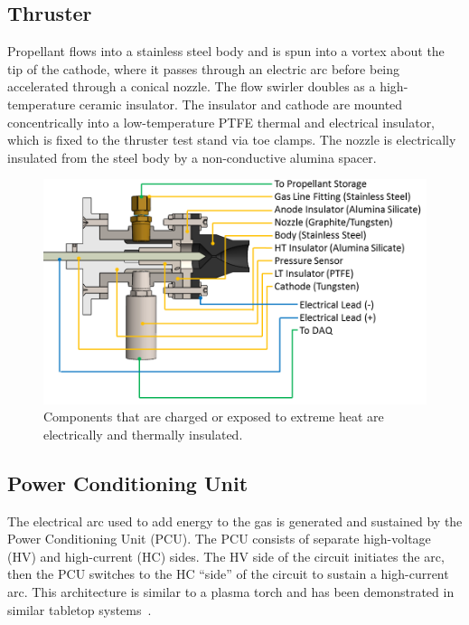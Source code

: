 \documentclass[conference]{IEEEtran}
\begin{document}
\subsection{Thruster}
Propellant flows into a stainless steel body and is spun into a vortex about the tip of the cathode, where it passes through an electric arc before being accelerated through a conical nozzle.
The flow swirler doubles as a high-temperature ceramic insulator.
The insulator and cathode are mounted concentrically into a low-temperature PTFE thermal and electrical insulator, which is fixed to the thruster test stand via toe clamps.
The nozzle is electrically insulated from the steel body by a non-conductive alumina spacer.

\begin{figure}[htp]
  \centering
  \includegraphics[width=\linewidth]{figs/cutaway_annotated.png}
  \caption[P17101 Arcjet Annotated Cutaway]{Components that are charged or exposed to extreme heat are electrically and thermally insulated.
\label{fig:annotated-cutaway}
}
\end{figure}

\subsection{Power Conditioning Unit}
The electrical arc used to add energy to the gas is generated and sustained by the Power Conditioning Unit (PCU).
The PCU consists of separate high-voltage (HV) and high-current (HC) sides.
The HV side of the circuit initiates the arc, then the PCU switches to the HC ``side'' of the circuit to sustain a high-current arc.
This architecture is similar to a plasma torch and has been demonstrated in similar tabletop systems~\cite{park2015thesis}.
\end{document}
